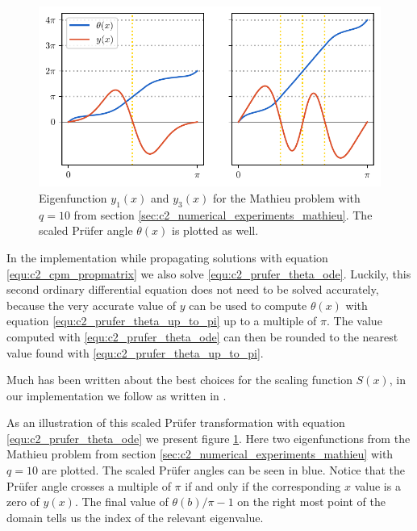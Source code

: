 \begin{figure}
    \begin{center}
        \includegraphics[width=\textwidth]{img/chapter2/prufer/prufer_curves.pdf}
    \end{center}
    \caption{Eigenfunction $y_1(x)$ and $y_3(x)$ for the Mathieu problem with $q = 10$ from section \ref{sec:c2_numerical_experiments_mathieu}. The scaled Prüfer angle $\theta(x)$ is plotted as well.}\label{fig:c2_prufer_curves}
\end{figure}

In the implementation while propagating solutions with equation \eqref{equ:c2_cpm_propmatrix} we also solve \eqref{equ:c2_prufer_theta_ode}. Luckily, this second ordinary differential equation does not need to be solved accurately, because the very accurate value of $y$ can be used to compute $\theta(x)$ with equation \eqref{equ:c2_prufer_theta_up_to_pi} up to a multiple of $\pi$. The value computed with \eqref{equ:c2_prufer_theta_ode} can then be rounded to the nearest value found with \eqref{equ:c2_prufer_theta_up_to_pi}.

Much has been written  about the best choices for the scaling function $S(x)$, in our implementation we follow \matslise{} as written in \cite{ledoux_study_2007}.

As an illustration of this scaled Prüfer transformation with equation \eqref{equ:c2_prufer_theta_ode} we present figure \ref{fig:c2_prufer_curves}. Here two eigenfunctions from the Mathieu problem from section \ref{sec:c2_numerical_experiments_mathieu} with $q=10$ are plotted. The scaled Prüfer angles can be seen in blue. Notice that the Prüfer angle crosses a multiple of $\pi$ if and only if the corresponding $x$ value is a zero of $y(x)$. The final value of $\theta(b) / \pi - 1$ on the right most point of the domain tells us the index of the relevant eigenvalue.

